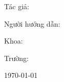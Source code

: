 
\begin{frame}
    \centering
    {\LARGE \TENLUANVAN \par}
    \vspace{0.5cm}
    {\large \textit{\THESISNAME} \par}
\end{frame}

\begin{frame}
    \centering
    {\Large Tác giả: \TENTACGIA \par}
    {\Large Người hướng dẫn: \TENNGUOIHUONGDAN \par}
    \vspace{0.5cm}
    {\small Khoa: \KHOA \par}
    {\small Trường: \TRUONG \par}
    \vfill
    {\footnotesize \today}
\end{frame}

